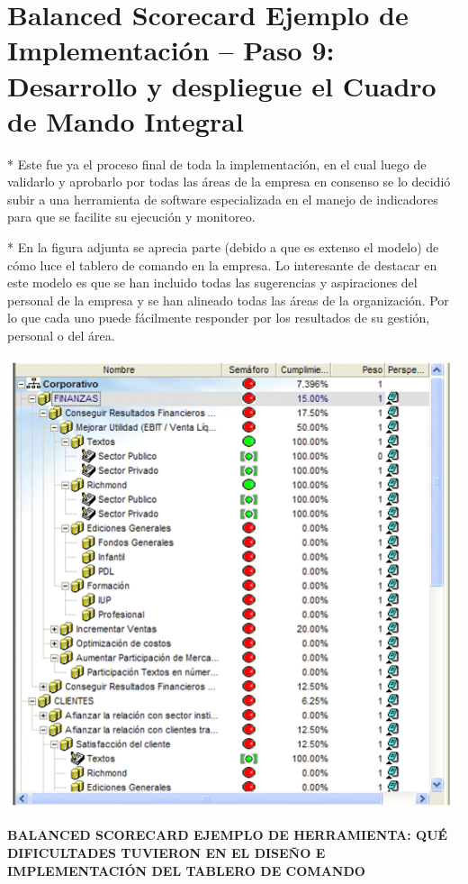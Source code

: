 \section{Balanced Scorecard Ejemplo de Implementación – Paso 9: Desarrollo y despliegue el Cuadro de Mando Integral}
\item {* Este fue ya el proceso final de toda la implementación, en el cual luego de validarlo y aprobarlo por todas las áreas de la empresa en consenso se lo decidió subir a una herramienta de software especializada en el manejo de indicadores para que se facilite su ejecución y monitoreo.

* En la figura adjunta se aprecia parte (debido a que es extenso el modelo) de cómo luce el tablero de comando en la empresa. Lo interesante de destacar en este modelo es que se han incluido todas las sugerencias y aspiraciones del personal de la empresa y se han alineado todas las áreas de la organización. Por lo que cada uno puede fácilmente responder por los resultados de su gestión, personal o del área.}
\begin{center}
\includegraphics[width=15cm]{./Imagenes/img02.png}
\end{center}



\begin{center}
\vspace*{0.1in}
\begin{Large}
\textbf{BALANCED SCORECARD EJEMPLO DE HERRAMIENTA: QUÉ DIFICULTADES TUVIERON EN EL DISEÑO E IMPLEMENTACIÓN DEL TABLERO DE COMANDO} \\
\end{Large}
\end{center}


